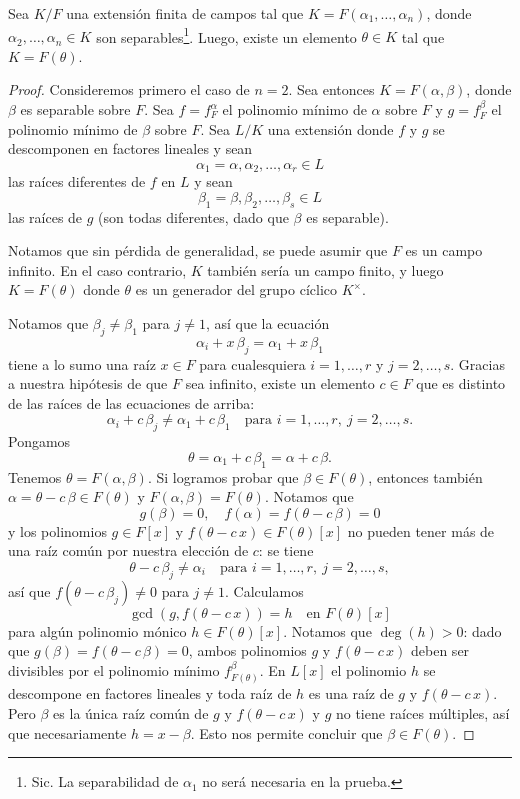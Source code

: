 \begin{teorema}
  Sea $K/F$ una extensión finita de campos tal que
  $K = F (\alpha_1,\ldots,\alpha_n)$, donde $\alpha_2,\ldots,\alpha_n \in K$ son
  separables\footnote{Sic. La separabilidad de $\alpha_1$ no será necesaria en
    la prueba.}. Luego, existe un elemento $\theta \in K$ tal que
  $K = F (\theta)$.

  \begin{proof}
    Consideremos primero el caso de $n = 2$. Sea entonces
    $K = F (\alpha,\beta)$, donde $\beta$ es separable sobre $F$.
    Sea $f = f^\alpha_F$ el polinomio mínimo de $\alpha$ sobre $F$ y
    $g = f^\beta_F$ el polinomio mínimo de $\beta$ sobre $F$. Sea $L/K$ una
    extensión donde $f$ y $g$ se descomponen en factores lineales y sean
    $$\alpha_1 = \alpha, \alpha_2, \ldots, \alpha_r \in L$$
    las raíces diferentes de $f$ en $L$ y sean
    $$\beta_1 = \beta, \beta_2, \ldots, \beta_s \in L$$
    las raíces de $g$ (son todas diferentes, dado que $\beta$ es separable).

    Notamos que sin pérdida de generalidad, se puede asumir que $F$ es un campo
    infinito. En el caso contrario, $K$ también sería un campo finito, y luego
    $K = F (\theta)$ donde $\theta$ es un generador del grupo cíclico
    $K^\times$.

    Notamos que $\beta_j \ne \beta_1$ para $j \ne 1$, así que la ecuación
    $$\alpha_i + x\,\beta_j = \alpha_1 + x\,\beta_1$$
    tiene a lo sumo una raíz $x\in F$ para cualesquiera $i = 1,\ldots,r$ y
    $j = 2,\ldots,s$. Gracias a nuestra hipótesis de que $F$ sea infinito,
    existe un elemento $c\in F$ que es distinto de las raíces de las ecuaciones
    de arriba:
    \[ \alpha_i + c\,\beta_j \ne \alpha_1 + c\,\beta_1
       \quad\text{para }i = 1,\ldots,r, ~ j = 2,\ldots,s. \]
    Pongamos
    $$\theta = \alpha_1 + c\,\beta_1 = \alpha + c\,\beta.$$
    Tenemos $\theta = F (\alpha,\beta)$. Si logramos probar que
    $\beta \in F (\theta)$, entonces también
    $\alpha = \theta - c\,\beta \in F (\theta)$ y
    $F (\alpha,\beta) = F (\theta)$. Notamos que
    $$g (\beta) = 0, \quad f (\alpha) = f (\theta - c\,\beta) = 0$$
    y los polinomios $g \in F [x]$ y $f (\theta - c\,x) \in F (\theta) [x]$ no
    pueden tener más de una raíz común por nuestra elección de $c$: se tiene
    $$\theta - c\,\beta_j \ne \alpha_i\quad\text{para }i = 1,\ldots,r, ~ j = 2,\ldots,s,$$
    así que $f (\theta - c\,\beta_j) \ne 0$ para $j \ne 1$. Calculamos
    $$\gcd (g, f (\theta - c\,x)) = h \quad\text{en }F (\theta) [x]$$
    para algún polinomio mónico $h \in F (\theta) [x]$. Notamos que
    $\deg (h) > 0$: dado que $g (\beta) = f (\theta - c\,\beta) = 0$,
    ambos polinomios $g$ y $f (\theta - c\,x)$ deben ser divisibles por el
    polinomio mínimo $f^\beta_{F (\theta)}$. En $L [x]$ el polinomio $h$ se
    descompone en factores lineales y toda raíz de $h$ es una raíz de $g$ y
    $f (\theta - c\,x)$. Pero $\beta$ es la única raíz común de $g$ y
    $f (\theta - c\,x)$ y $g$ no tiene raíces múltiples, así que necesariamente
    $h = x - \beta$. Esto nos permite concluir que $\beta \in F (\theta)$.


\end{proof}
\end{teorema}
